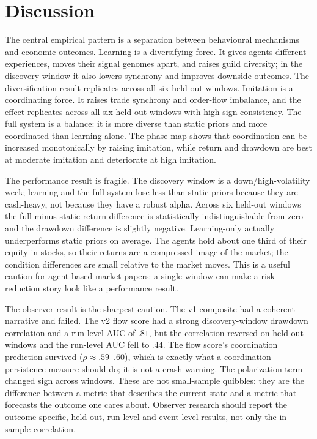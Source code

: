 \documentclass[11pt]{article}
\begin{document}
\section{Discussion}

The central empirical pattern is a separation between behavioural mechanisms and
economic outcomes. Learning is a diversifying force. It gives agents different
experiences, moves their signal genomes apart, and raises guild diversity; in the
discovery window it also lowers synchrony and improves downside outcomes. The
diversification result replicates across all six held-out windows. Imitation is a
coordinating force. It raises trade synchrony and order-flow imbalance, and the
effect replicates across all six held-out windows with high sign consistency. The
full system is a balance: it is more diverse than static priors and more
coordinated than learning alone. The phase map shows that coordination can be
increased monotonically by raising imitation, while return and drawdown are best
at moderate imitation and deteriorate at high imitation.

The performance result is fragile. The discovery window is a down/high-volatility
week; learning and the full system lose less than static priors because they are
cash-heavy, not because they have a robust alpha. Across six held-out windows the
full-minus-static return difference is statistically indistinguishable from zero
and the drawdown difference is slightly negative. Learning-only actually
underperforms static priors on average. The agents hold about one third of their
equity in stocks, so their returns are a compressed image of the market; the
condition differences are small relative to the market moves. This is a useful
caution for agent-based market papers: a single window can make a risk-reduction
story look like a performance result.

The observer result is the sharpest caution. The v1 composite had a coherent
narrative and failed. The v2 flow score had a strong discovery-window drawdown
correlation and a run-level AUC of $.81$, but the correlation reversed on held-out
windows and the run-level AUC fell to $.44$. The flow score's coordination
prediction survived ($\rho\approx.59$--$.60$), which is exactly what a
coordination-persistence measure should do; it is not a crash warning. The
polarization term changed sign across windows. These are not small-sample
quibbles: they are the difference between a metric that describes the current
state and a metric that forecasts the outcome one cares about. Observer research
should report the outcome-specific, held-out, run-level and event-level results,
not only the in-sample correlation.
\end{document}
